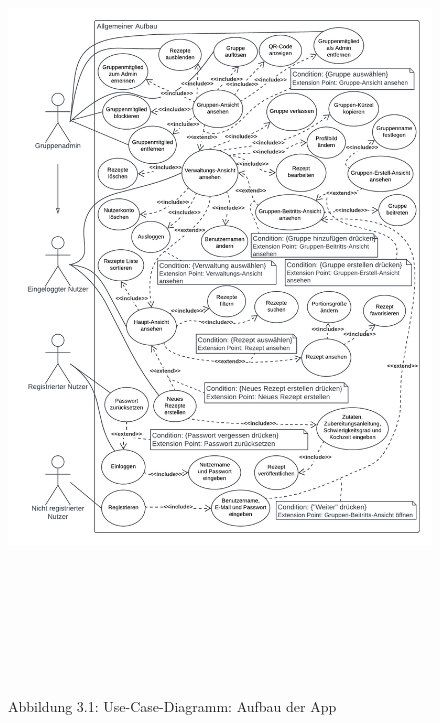 \documentclass[parskip=full]{scrartcl}
\begin{document}
\begin{figure}[!htp]
    \centering
    \begin{adjustbox}{right=160mm}
        \includegraphics[height=220mm]{images/section3/UseCaseDiagram.png}
    \end{adjustbox}
    \caption*{Abbildung 3.1: Use-Case-Diagramm: Aufbau der App}
    \label{fig:A31}
\end{figure}
\newpage
\end{document}
